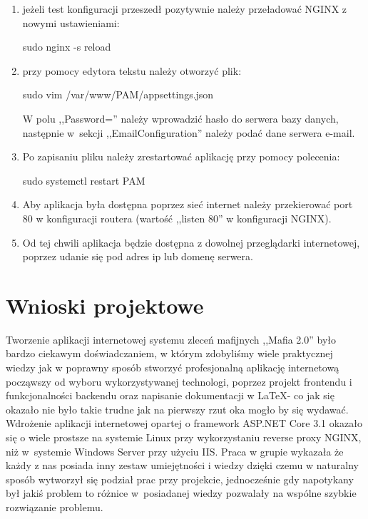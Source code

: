 \documentclass[12pt,a4paper]{article}
\begin{document}
\begin{enumerate}
				\item jeżeli test konfiguracji przeszedł pozytywnie należy przeładować NGINX z nowymi ustawieniami:	
					\begin{tcolorbox}[minipage,colback=white,arc=0pt,outer arc=0pt, fontupper=\footnotesize]
						sudo nginx -s reload
					\end{tcolorbox}			
			
				\item przy pomocy edytora tekstu należy otworzyć plik:
					\begin{tcolorbox}[minipage,colback=white,arc=0pt,outer arc=0pt, fontupper=\footnotesize]
						sudo vim /var/www/PAM/appsettings.json
					\end{tcolorbox}						
					W polu ,,Password='' należy wprowadzić hasło do serwera bazy danych, następnie w~sekcji ,,EmailConfiguration'' należy podać dane serwera e-mail.
				\item Po zapisaniu pliku należy zrestartować aplikację przy pomocy polecenia:
					\begin{tcolorbox}[minipage,colback=white,arc=0pt,outer arc=0pt, fontupper=\footnotesize]
						sudo systemctl restart PAM
					\end{tcolorbox}
				\item Aby aplikacja była dostępna poprzez sieć internet należy przekierować port 80 w konfiguracji routera (wartość ,,listen 80'' w konfiguracji NGINX).
				\item Od tej chwili aplikacja będzie dostępna z dowolnej przeglądarki internetowej, poprzez udanie się pod adres ip lub domenę serwera. 
			\end{enumerate}
	\newpage
	
	\section{Wnioski projektowe}
		\indent Tworzenie aplikacji internetowej systemu zleceń mafijnych ,,Mafia 2.0'' było bardzo ciekawym doświadczaniem, w którym zdobyliśmy wiele praktycznej wiedzy jak w poprawny sposób
		stworzyć profesjonalną aplikację internetową począwszy od wyboru wykorzystywanej technologi, poprzez projekt frontendu i funkcjonalności backendu oraz napisanie dokumentacji
		w \LaTeX \space	- co jak się okazało nie było takie trudne jak na pierwszy rzut oka mogło by się wydawać. Wdrożenie aplikacji internetowej opartej o framework
		ASP.NET Core 3.1 okazało się o wiele prostsze na systemie Linux przy wykorzystaniu reverse proxy NGINX, niż w~systemie Windows Server przy użyciu IIS.
		Praca w grupie wykazała że każdy z nas posiada inny zestaw umiejętności i wiedzy dzięki czemu w naturalny sposób wytworzył się podział prac przy projekcie,
		jednocześnie gdy napotykany był jakiś problem to różnice w~posiadanej wiedzy pozwalały na wspólne szybkie rozwiązanie problemu. 		
\end{document}
